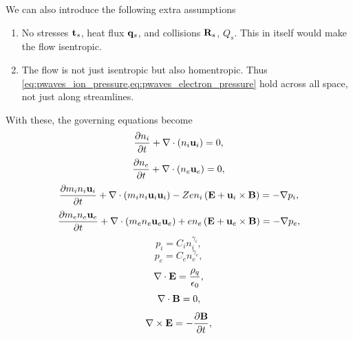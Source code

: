 \documentclass[a4paper,11pt]{report}
\begin{document}
We can also introduce the following extra assumptions
\begin{enumerate}
    \item No stresses $\mathbf{t}_s$, heat flux $\mathbf{q}_s$, and collisions $\mathbf{R}_s$, $Q_s$. This in itself would make the flow isentropic.
    \item The flow is not just isentropic but also homentropic. Thus \cref{eq:pwaves_ion_pressure,eq:pwaves_electron_pressure} hold across all space, not just along streamlines.
\end{enumerate}
With these, the governing equations become
\begin{equation}
    \label{eq:pwaves_ion_density}
    \frac{\partial n_i}{\partial t} + \nabla \cdot \left (n_i \mathbf{u}_i \right ) = 0,
\end{equation}
\begin{equation}
    \label{eq:pwaves_electron_density}
    \frac{\partial n_e}{\partial t} + \nabla \cdot \left (n_e \mathbf{u}_e \right ) = 0,
\end{equation}
\begin{equation}
    \label{eq:pwaves_ion_momentum}
    \frac{\partial m_i n_i \mathbf{u}_i}{\partial t} + \nabla \cdot \left ( m_i n_i \mathbf{u}_i \mathbf{u}_i \right ) - Ze n_i \left ( \mathbf{E} + \mathbf{u}_i \times \mathbf{B} \right ) = -\nabla p_i,
\end{equation}
\begin{equation}
    \label{eq:pwaves_electron_momentum}
    \frac{\partial m_e n_e \mathbf{u}_e}{\partial t} + \nabla \cdot \left ( m_e n_e \mathbf{u}_e \mathbf{u}_e \right ) + e n_e \left ( \mathbf{E} + \mathbf{u}_e \times \mathbf{B} \right ) = -\nabla p_e,
\end{equation}
\begin{equation}
    \label{eq:pwaves_ion_pressure}
    p_i = C_i n_i^{\gamma_i},
\end{equation}
\begin{equation}
    \label{eq:pwaves_electron_pressure}
    p_e = C_e n_e^{\gamma_e},
\end{equation}
\begin{equation}
    \label{eq:pwaves_maxwell_3}
    \nabla \cdot \mathbf{E} = \frac{\rho_q}{\epsilon_0},
\end{equation}
\begin{equation}
    \label{eq:p_waves_maxwell_4}
    \nabla \cdot \mathbf{B} = 0,
\end{equation}
\begin{equation}
    \label{eq:p_waves_maxwell_1}
    \nabla \times \mathbf{E} = -\frac{ \partial \mathbf{B}}{\partial t},
\end{equation}
\end{document}
